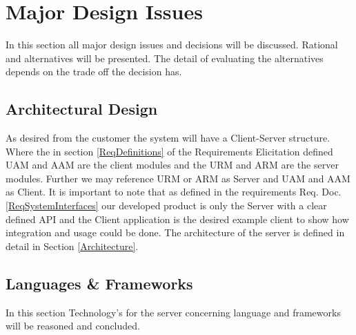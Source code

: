\documentclass[a4paper,11pt]{article}
\begin{document}
\newpage
\section{Major Design Issues} \label{Major_Design_Issues}
In this section all major design issues and decisions will be discussed. Rational and alternatives will be presented. The detail of evaluating the alternatives depends on the trade off the decision has.

\subsection{Architectural Design} \label{2.1 Architectural Design}
As desired from the customer the system will have a Client-Server structure. Where the in section \ref{ReqDefinitions} of the Requirements Elicitation defined UAM and AAM are the client modules and the URM and ARM are the server modules. Further we may reference URM or ARM as Server and UAM and AAM as Client. It is important to note that as defined in the requirements Req. Doc. \ref{ReqSystemInterfaces} our developed product is only the Server with a clear defined API and the Client application is the desired example client to show how integration and usage could be done.
The architecture of the server is defined in detail in Section \ref{Architecture}.

\subsection{Languages \& Frameworks}
In this section Technology's for the server concerning language and frameworks will be reasoned and concluded.
\end{document}
